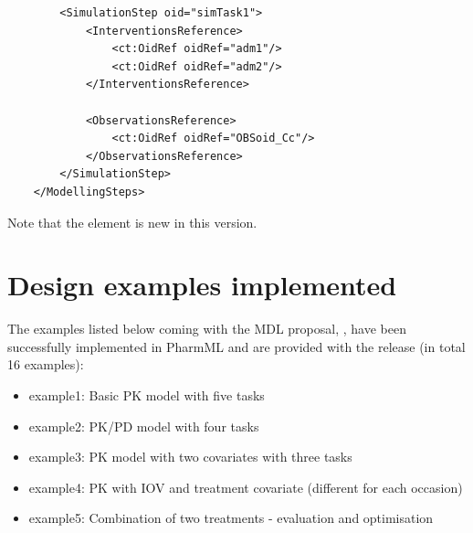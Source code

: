 \begin{example}
\begin{lstlisting}
        <SimulationStep oid="simTask1">
            <InterventionsReference>
                <ct:OidRef oidRef="adm1"/>
                <ct:OidRef oidRef="adm2"/>
            </InterventionsReference>
            
            <ObservationsReference>
                <ct:OidRef oidRef="OBSoid_Cc"/>
            </ObservationsReference>
        </SimulationStep>
    </ModellingSteps>
\end{lstlisting}
Note that the  element is new in this version.
\end{example}

\section{Design examples implemented}
The examples listed below coming with the MDL proposal, \cite{CommetsExamples2015},
have been successfully implemented in PharmML and are provided with the release 
(in total 16 examples):

\begin{itemize}
\item 
example1: Basic PK model with five tasks
\item 
example2: PK/PD model with four tasks
\item 
example3: PK model with two covariates with three tasks
\item 
example4: PK with IOV and treatment covariate (different for each occasion)
\item 
example5: Combination of two treatments - evaluation and optimisation
\end{itemize}



